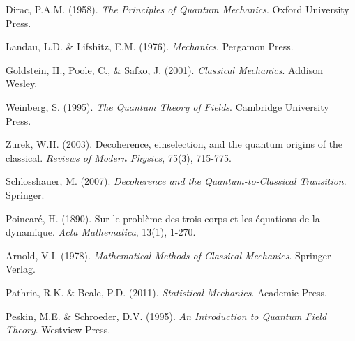 \documentclass[11pt]{article}
\theoremstyle{remark}
\begin{document}
\begin{thebibliography}{99}

Dirac, P.A.M. (1958). \textit{The Principles of Quantum Mechanics}. Oxford University Press.

Landau, L.D. \& Lifshitz, E.M. (1976). \textit{Mechanics}. Pergamon Press.

Goldstein, H., Poole, C., \& Safko, J. (2001). \textit{Classical Mechanics}. Addison Wesley.

Weinberg, S. (1995). \textit{The Quantum Theory of Fields}. Cambridge University Press.

Zurek, W.H. (2003). Decoherence, einselection, and the quantum origins of the classical. \textit{Reviews of Modern Physics}, 75(3), 715-775.

Schlosshauer, M. (2007). \textit{Decoherence and the Quantum-to-Classical Transition}. Springer.

Poincaré, H. (1890). Sur le problème des trois corps et les équations de la dynamique. \textit{Acta Mathematica}, 13(1), 1-270.

Arnold, V.I. (1978). \textit{Mathematical Methods of Classical Mechanics}. Springer-Verlag.

Pathria, R.K. \& Beale, P.D. (2011). \textit{Statistical Mechanics}. Academic Press.

Peskin, M.E. \& Schroeder, D.V. (1995). \textit{An Introduction to Quantum Field Theory}. Westview Press.

\end{thebibliography}
\end{document}
